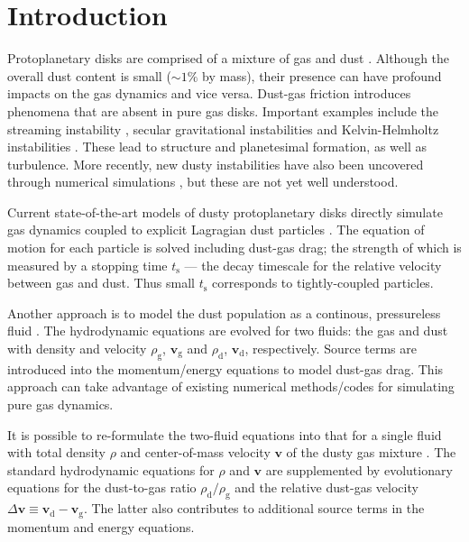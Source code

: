 \documentclass[iop, numberedappendix]{emulateapj}
\newcommand{\rhod}{\rho_\mathrm{d}}
\newcommand{\rhog}{\rho_\mathrm{g}}
\newcommand{\tstop}{t_\mathrm{s}}
\begin{document}
\section{Introduction}
Protoplanetary disks are comprised of a mixture of gas and dust
\citep{chiang10}. Although the overall dust content is small
($\sim 1\%$ by mass), their presence can have profound impacts on the 
gas dynamics and vice versa. Dust-gas friction introduces phenomena
that are absent in pure gas disks. Important examples include the
streaming instability 
\citep[SI,][]{youdin05a,youdin07b,johansen07}, secular gravitational
instabilities \citep[SGI,][]{ward00,youdin11,michikoshi12,takahashi14} and
Kelvin-Helmholtz instabilities
\citep{goldreich1973, chiang08,barranco09,lee10}. These lead to structure and
planetesimal formation, as well as turbulence. 
More recently, new 
dusty instabilities have also been uncovered through numerical
simulations \citep{loren15,loren16,lamb16}, but these are not yet well
understood. 



Current state-of-the-art models of dusty protoplanetary
disks directly simulate gas dynamics coupled to explicit
Lagragian dust particles
\citep{nelson10,bai10,johansen11,yang14,zhu14,gibbons15,simon16,baruteau16}. 
The equation of motion for each particle is solved 
including dust-gas drag; the strength of which is measured 
by a stopping time $\tstop$ --- the decay timescale for the 
relative velocity between gas and dust. Thus small $\tstop$
corresponds to tightly-coupled particles. 


Another approach is to model the dust population as a continous, pressureless
fluid 
\citep{paardekooper06b,meheut12,laibe12,loren14,fu14b,surville16}. The 
hydrodynamic equations are evolved for two fluids: the gas and dust with density and
velocity $\rhog$, $\bm{v}_\mathrm{g}$ and $\rhod$, 
$\bm{v}_\mathrm{d}$, respectively. Source terms are introduced into
the momentum/energy equations to model dust-gas drag. This approach
can take advantage of existing numerical methods/codes for
simulating pure gas dynamics. 


It is possible to re-formulate the two-fluid equations into that for a
single fluid with total density $\rho$ and center-of-mass
velocity $\bm{v}$ of the dusty gas mixture
\citep{laibe14}. The standard hydrodynamic equations for
$\rho$ and $\bm{v}$ are supplemented by evolutionary equations for
the dust-to-gas ratio $\rhod/\rhog$ and the relative dust-gas velocity
$\Delta\bm{v}\equiv \bm{v}_\mathrm{d}-\bm{v}_\mathrm{g}$. The latter also contributes to 
additional source terms in the momentum and energy equations.  
\end{document}
